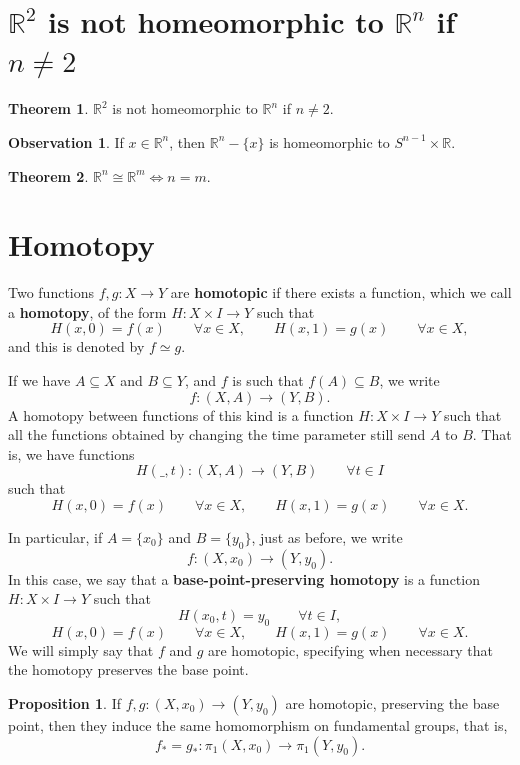 \documentclass{book}
\theoremstyle{definition}
\newtheorem*{obs}{Observation}
\newtheorem*{teo}{Theorem}
\newtheorem*{prop}{Proposition}
\newcommand{\R}{\mathbb{R}}
\begin{document}
\section{$\R^2$ is not homeomorphic to $\R^n$ if $n\neq2$}

\begin{teo}
$\R^2$ is not homeomorphic to $\R^n$ if $n\neq2$.
\end{teo}

\begin{obs}
If $x\in\R^n$, then $\R^n-\{x\}$ is homeomorphic to
$S^{n-1}\times\R$.
\end{obs}

\begin{teo}
$\R^n\cong\R^m\iff n=m$.
\end{teo}

\section{Homotopy}
\label{def:func-homot}

Two functions $f,g:X\to Y$ are \textbf{homotopic} if there
exists a function, which we call a \textbf{homotopy}, of the
form $H:X\times I\to Y$ such that
$$
H(x,0)=f(x)\qquad\forall x\in X,
\qquad
H(x,1)=g(x)\qquad\forall x\in X,
$$
and this is denoted by $f\simeq g$.

If we have $A\subseteq X$ and $B\subseteq Y$, and $f$ is
such that $f(A)\subseteq B$, we write
$$
f:(X,A)\to(Y,B).
$$
A homotopy between functions of this kind is a function
$H:X\times I\to Y$ such that all the functions obtained by
changing the time parameter still send $A$ to $B$. That is,
we have functions
$$
H(\_,t):(X,A)\to(Y,B)\qquad\forall t\in I
$$
such that
$$
H(x,0)=f(x)\qquad\forall x\in X,
\qquad
H(x,1)=g(x)\qquad\forall x\in X.
$$

In particular, if $A=\{x_0\}$ and $B=\{y_0\}$, just as
before, we write
$$
f:(X,x_0)\to(Y,y_0).
$$
In this case, we say that a \textbf{base-point-preserving
homotopy} is a function $H:X\times I\to Y$ such that
$$
H(x_0,t)=y_0\qquad\forall t\in I,
$$
$$
H(x,0)=f(x)\qquad\forall x\in X,
\qquad
H(x,1)=g(x)\qquad\forall x\in X.
$$
We will simply say that $f$ and $g$ are homotopic,
specifying when necessary that the homotopy preserves the
base point.

\begin{prop}
If $f,g:(X,x_0)\to(Y,y_0)$ are homotopic, preserving the
base point, then they induce the same homomorphism on
fundamental groups, that is,
$$
f_*=g_*:\pi_1(X,x_0)\to\pi_1(Y,y_0).
$$
\end{prop}
\end{document}

